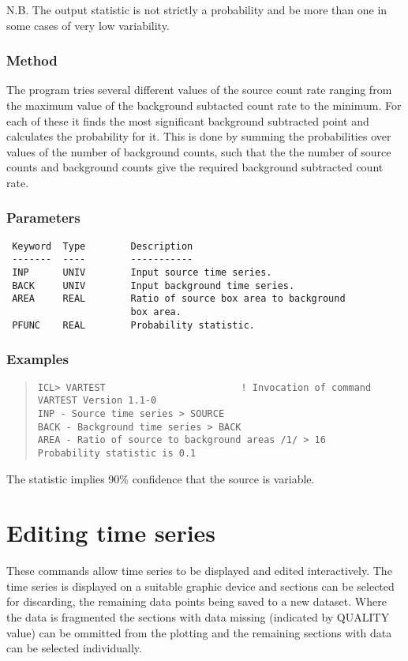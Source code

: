 \documentclass{book}
\renewcommand{\_}{{\tt\char'137}}     %
\begin{document}
N.B. The output statistic is not strictly a probability
and be more than one in some cases of very low
variability.
 
\subsection{Method}
The program tries several different values of the source count rate
ranging from the maximum value of the background subtacted count rate
to the minimum. For each of these it finds the most significant
background subtracted point and calculates the probability for it.
This is done by summing the probabilities over values of the number
of background counts, such that the the number of source counts and
background counts give the required background subtracted count rate.
 
\subsection{Parameters}
\begin{verbatim}
 Keyword  Type        Description
 -------  ----        -----------
 INP      UNIV        Input source time series.
 BACK     UNIV        Input background time series.
 AREA     REAL        Ratio of source box area to background
                      box area.
 PFUNC    REAL        Probability statistic.
\end{verbatim}\subsection{Examples}
\begin{quote}\begin{verbatim}
ICL> VARTEST                        ! Invocation of command
VARTEST Version 1.1-0
INP - Source time series > SOURCE
BACK - Background time series > BACK
AREA - Ratio of source to background areas /1/ > 16
Probability statistic is 0.1
\end{verbatim}\end{quote}
The statistic implies 90\% confidence that the source is variable.
\chapter{Editing time series}
These commands allow time series to be displayed and edited interactively.
The time series is displayed on a suitable graphic device and sections
can be selected for discarding, the remaining data points being saved
to a new dataset. Where the data is fragmented the sections with data
missing (indicated by QUALITY value) can be ommitted from the plotting
and the remaining sections with data can be selected individually.
 
\end{document}
